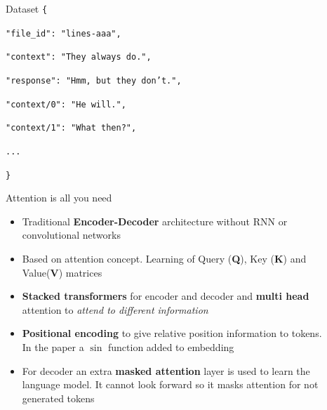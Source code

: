 \documentclass[final]{beamer}
\newlength{\sepwid}
\newlength{\onecolwid}
\newlength{\twocolwid}
\begin{document}
\begin{frame}[t]
\begin{columns}[t]
\begin{column}{\onecolwid}
\begin{block}{Dataset}
 \texttt{\{}
 
 \texttt{"file\_id": "lines-aaa",}
 
 \texttt{"context": "They always do.", }
 
 \texttt{"response": "Hmm, but they don't.", }
 
\texttt{"context/0": "He will.",}

\texttt{"context/1": "What then?",}
  
\texttt{...}

\texttt{\}}
\end{block}


\begin{block}{Attention is all you need}
	\begin{itemize} 
	\item Traditional \textbf{Encoder-Decoder} architecture without RNN or convolutional networks
	\item Based on attention concept. Learning of Query (\textbf{Q}), Key (\textbf{K}) and Value(\textbf{V}) matrices
    \item \textbf{Stacked transformers} for encoder and decoder and \textbf{multi head} attention to \textit{attend to different information}
	\item \textbf{Positional encoding} to give relative position information to tokens. In the paper a $\sin$ function added to embedding
	\item For decoder an extra \textbf{masked attention} layer is used to learn the language model. It cannot look forward so it masks attention for not generated tokens
	\end{itemize}

\end{block}

\end{column} %

\begin{column}{\sepwid}\end{column} %

\begin{column}{\twocolwid} %

\begin{columns}[t,totalwidth=\twocolwid] %


\end{columns}
\end{column}
\end{columns}
\end{frame}
\end{document}
